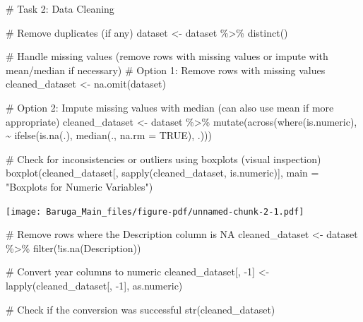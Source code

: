 \documentclass[
  letterpaper,
  DIV=11,
  numbers=noendperiod]{scrreprt}
\newenvironment{Shaded}{\begin{snugshade}}{\end{snugshade}}
\newcommand{\AttributeTok}[1]{\textcolor[rgb]{0.40,0.45,0.13}{#1}}
\newcommand{\CommentTok}[1]{\textcolor[rgb]{0.37,0.37,0.37}{#1}}
\newcommand{\ConstantTok}[1]{\textcolor[rgb]{0.56,0.35,0.01}{#1}}
\newcommand{\DecValTok}[1]{\textcolor[rgb]{0.68,0.00,0.00}{#1}}
\newcommand{\FunctionTok}[1]{\textcolor[rgb]{0.28,0.35,0.67}{#1}}
\newcommand{\NormalTok}[1]{\textcolor[rgb]{0.00,0.23,0.31}{#1}}
\newcommand{\OtherTok}[1]{\textcolor[rgb]{0.00,0.23,0.31}{#1}}
\newcommand{\SpecialCharTok}[1]{\textcolor[rgb]{0.37,0.37,0.37}{#1}}
\newcommand{\StringTok}[1]{\textcolor[rgb]{0.13,0.47,0.30}{#1}}
\begin{document}
\begin{Shaded}
\begin{Highlighting}[]
\CommentTok{\# Task 2: Data Cleaning}

\CommentTok{\# Remove duplicates (if any)}
\NormalTok{dataset }\OtherTok{\textless{}{-}}\NormalTok{ dataset }\SpecialCharTok{\%\textgreater{}\%} \FunctionTok{distinct}\NormalTok{()}

\CommentTok{\# Handle missing values (remove rows with missing values or impute with mean/median if necessary)}
\CommentTok{\# Option 1: Remove rows with missing values}
\NormalTok{cleaned\_dataset }\OtherTok{\textless{}{-}} \FunctionTok{na.omit}\NormalTok{(dataset)}

\CommentTok{\# Option 2: Impute missing values with median (can also use mean if more appropriate)}
\NormalTok{cleaned\_dataset }\OtherTok{\textless{}{-}}\NormalTok{ dataset }\SpecialCharTok{\%\textgreater{}\%} 
  \FunctionTok{mutate}\NormalTok{(}\FunctionTok{across}\NormalTok{(}\FunctionTok{where}\NormalTok{(is.numeric), }\SpecialCharTok{\textasciitilde{}} \FunctionTok{ifelse}\NormalTok{(}\FunctionTok{is.na}\NormalTok{(.), }\FunctionTok{median}\NormalTok{(., }\AttributeTok{na.rm =} \ConstantTok{TRUE}\NormalTok{), .)))}

\CommentTok{\# Check for inconsistencies or outliers using boxplots (visual inspection)}
\FunctionTok{boxplot}\NormalTok{(cleaned\_dataset[, }\FunctionTok{sapply}\NormalTok{(cleaned\_dataset, is.numeric)], }\AttributeTok{main =} \StringTok{"Boxplots for Numeric Variables"}\NormalTok{)}
\end{Highlighting}
\end{Shaded}

\texttt{[image: Baruga\_Main\_files/figure-pdf/unnamed-chunk-2-1.pdf]}

\begin{Shaded}
\begin{Highlighting}[]
\CommentTok{\# Remove rows where the Description column is NA}
\NormalTok{cleaned\_dataset }\OtherTok{\textless{}{-}}\NormalTok{ dataset }\SpecialCharTok{\%\textgreater{}\%} \FunctionTok{filter}\NormalTok{(}\SpecialCharTok{!}\FunctionTok{is.na}\NormalTok{(Description))}

\CommentTok{\# Convert year columns to numeric}
\NormalTok{cleaned\_dataset[, }\SpecialCharTok{{-}}\DecValTok{1}\NormalTok{] }\OtherTok{\textless{}{-}} \FunctionTok{lapply}\NormalTok{(cleaned\_dataset[, }\SpecialCharTok{{-}}\DecValTok{1}\NormalTok{], as.numeric)}

\CommentTok{\# Check if the conversion was successful}
\FunctionTok{str}\NormalTok{(cleaned\_dataset)}
\end{Highlighting}
\end{Shaded}
\end{document}
